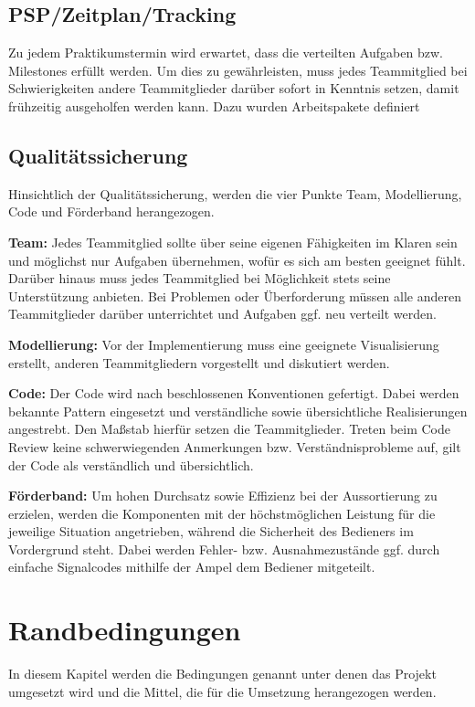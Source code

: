 \documentclass[a4paper, 11pt]{article}
\begin{document}
\subsection{PSP/Zeitplan/Tracking}
Zu jedem Praktikumstermin wird erwartet, dass die verteilten Aufgaben bzw. Milestones erfüllt werden. Um dies zu gewährleisten, muss jedes Teammitglied bei Schwierigkeiten andere Teammitglieder darüber sofort in Kenntnis setzen, damit frühzeitig ausgeholfen werden kann. Dazu wurden Arbeitspakete definiert
\subsection{Qualitätssicherung}
Hinsichtlich der Qualitätssicherung, werden die vier Punkte Team, Modellierung, Code und Förderband herangezogen.
\medskip
\begin{compactenum}[1.]
\item \textbf{Team:} Jedes Teammitglied sollte über seine eigenen Fähigkeiten im Klaren sein und möglichst nur Aufgaben übernehmen, wofür es sich am besten geeignet fühlt. Darüber hinaus muss jedes Teammitglied bei Möglichkeit stets seine Unterstützung anbieten. Bei Problemen oder Überforderung müssen alle anderen Teammitglieder darüber unterrichtet und Aufgaben ggf. neu verteilt werden.
\medskip
\item \textbf{Modellierung:} Vor der Implementierung muss eine geeignete Visualisierung erstellt, anderen Teammitgliedern vorgestellt und diskutiert werden. 
\medskip
\item \textbf{Code:} Der Code wird nach beschlossenen Konventionen gefertigt. Dabei werden bekannte Pattern eingesetzt und verständliche sowie übersichtliche Realisierungen angestrebt. Den Maßstab hierfür setzen die Teammitglieder. Treten beim Code Review keine schwerwiegenden Anmerkungen bzw. Verständnisprobleme auf, gilt der Code als verständlich und übersichtlich.
\medskip
\item \textbf{Förderband:} Um hohen Durchsatz sowie Effizienz bei der Aussortierung zu erzielen, werden die Komponenten mit der höchstmöglichen Leistung für die jeweilige Situation angetrieben, während die Sicherheit des Bedieners im Vordergrund steht. Dabei werden Fehler- bzw. Ausnahmezustände ggf. durch einfache Signalcodes mithilfe der Ampel dem Bediener mitgeteilt.
\end{compactenum}

\section{Randbedingungen}
In diesem Kapitel werden die Bedingungen genannt unter denen das Projekt umgesetzt wird und die Mittel, die für die Umsetzung herangezogen werden.
\end{document}
